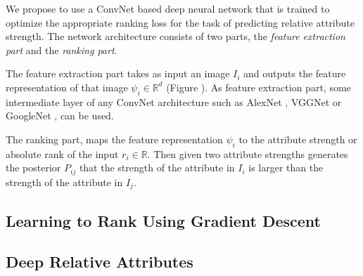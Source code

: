 \begin{figure}
{}
\end{figure}

We propose to use a ConvNet based deep neural network that is trained to optimize the appropriate ranking loss for the task of predicting relative attribute strength. The network architecture consists of two parts, the \textit{feature extraction part} and the \textit{ranking part}.

The feature extraction part takes as input an image $I_i$ and outputs the feature representation of that image $\psi_i \in \mathbb{R}^d$ (Figure \cite{fig.2}).
As feature extraction part, some intermediate layer of any ConvNet architecture such as AlexNet \cite{krizhevski}, VGGNet \cite{verydeep} or GoogleNet \cite{googlenet}, can be used.


The ranking part, maps the feature representation $\psi_i$ to the attribute strength or absolute rank of the input $r_i \in \mathbb{R}$. Then given two attribute strengths generates the posterior $P_{ij}$ that the strength of the attribute in $I_i$ is larger than the strength of the attribute in $I_j$. 

\subsection{Learning to Rank Using Gradient Descent}


\subsection{Deep Relative Attributes}


